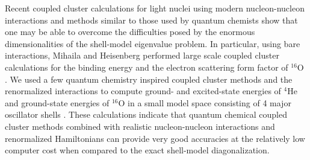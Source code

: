 \documentclass[epj]{svjour}
\begin{document}
Recent coupled cluster calculations for light nuclei using modern
nucleon-nucleon interactions and methods similar to those used
by quantum chemists
show that one may be able to overcome the
difficulties posed by the enormous dimensionalities of
the shell-model eigenvalue problem. In particular,
using bare interactions, Mihaila and 
Heisenberg performed large scale
coupled cluster calculations for the binding
energy and the electron scattering form factor of $^{16}$O
\cite{bogdan}. We used a few
quantum chemistry inspired coupled cluster methods and the
renormalized interactions to compute ground-
and excited-state energies of $^4$He and ground-state energies of $^{16}$O in a
small model space consisting of 4 major oscillator shells \cite{kowalski04}.
These calculations indicate that quantum chemical coupled cluster
methods combined with realistic nucleon-nucleon interactions and
renormalized Hamiltonians can provide very good accuracies at the relatively
low computer cost when compared to the exact
shell-model diagonalization.
\end{document}
